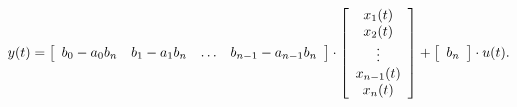   \begin{equation*}
    y(t) = 
    \left [ 
    \begin{array}{c c c c}
      b_0-a_0b_n & b_1-a_1b_n & \ldots & b_{n-1}-a_{n-1}b_n\\
    \end{array}
    \right ] \cdot
    \left [ 
    \begin{array}{c}
      x_1(t)\\
      x_2(t)\\
      \vdots \\
      x_{n-1}(t)\\
      x_{n}(t)\\
    \end{array}
    \right ]+
    \left [ 
    \begin{array}{c}
      b_n \\
    \end{array}
    \right ] \cdot
    u(t).
  \end{equation*}
  \normalsize

